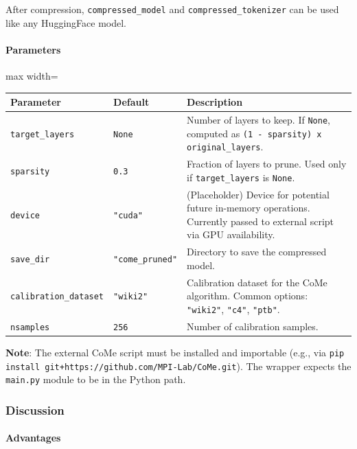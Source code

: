 After compression, \texttt{compressed\_model} and \texttt{compressed\_tokenizer} can be used like any HuggingFace model.

\paragraph{Parameters}

\begin{center}
\begin{adjustbox}{max width=\columnwidth}
\renewcommand{\arraystretch}{1.2}
\begin{tabular}{lll}
\toprule
Parameter & Default & Description \\
\midrule
\texttt{target\_layers} & \texttt{None} & Number of layers to keep. If \texttt{None}, computed as \texttt{(1 - sparsity) x original\_layers}. \\
\texttt{sparsity} & \texttt{0.3} & Fraction of layers to prune. Used only if \texttt{target\_layers} is \texttt{None}. \\
\texttt{device} & \texttt{"cuda"} & (Placeholder) Device for potential future in-memory operations. Currently passed to external script via GPU availability. \\
\texttt{save\_dir} & \texttt{"come\_pruned"} & Directory to save the compressed model. \\
\texttt{calibration\_dataset} & \texttt{"wiki2"} & Calibration dataset for the CoMe algorithm. Common options: \texttt{"wiki2"}, \texttt{"c4"}, \texttt{"ptb"}. \\
\texttt{nsamples} & \texttt{256} & Number of calibration samples. \\

\bottomrule
\end{tabular}
\end{adjustbox}
\end{center}
\textbf{Note}: The external CoMe script must be installed and importable (e.g., via \texttt{pip install git+https://github.com/MPI-Lab/CoMe.git}). The wrapper expects the \texttt{main.py} module to be in the Python path.


\subsubsection*{Discussion}

\paragraph{Advantages}

